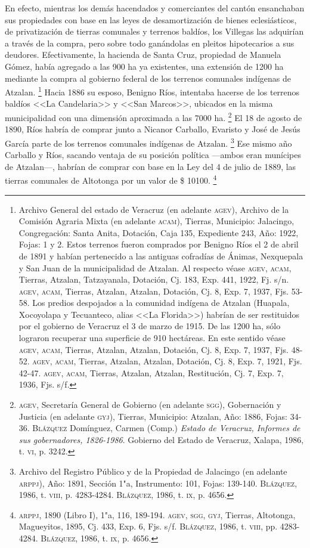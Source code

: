 \documentclass[14pt,twoside,final]{extbook} %
\let\oldfootnote\footnote
\renewcommand\footnote[1]{%
\oldfootnote{\hspace{1mm}#1}}
\begin{document}
En efecto, mientras los demás hacendados y comerciantes del cantón ensanchaban sus propiedades con base en las leyes de desamortización de bienes eclesiásticos, de privatización de tierras comunales y terrenos baldíos, los Villegas las adquirían a través de la compra, pero sobre todo ganándolas en pleitos hipotecarios a sus deudores. Efectivamente, la hacienda de Santa Cruz, propiedad de Manuela Gómez, había agregado a las 900 ha ya existentes, una extensión de 1200 ha mediante la compra al gobierno federal de los terrenos comunales indígenas de Atzalan.\footnote{Archivo General del estado de Veracruz (en adelante \textsc{agev}), Archivo de la Comisión Agraria Mixta
(en adelante \textsc{acam}), Tierras, Municipio: Jalacingo, Congregación: Santa Anita, Dotación, Caja 135, Expediente 243, Año: 1922, Fojas: 1 y 2. Estos terrenos fueron comprados por Benigno Ríos el 2 de abril de 1891 y habían pertenecido a las antiguas cofradías de Ánimas, Nexquepala y San Juan de la municipalidad de Atzalan. Al respecto véase \textsc{agev}, \textsc{acam}, Tierras, Atzalan, Tatzayanala, Dotación, Cj. 183, Exp. 441, 1922, Fj. s/n. \textsc{agev}, \textsc{acam}, Tierras, Atzalan, Atzalan, Dotación, Cj. 8, Exp. 7, 1937, Fjs. 53-58. Los predios despojados a la comunidad indígena de Atzalan (Huapala, Xocoyolapa y Tecuanteco, alias <<La Florida>>) habrían de ser restituidos por el gobierno de Veracruz el 3 de marzo de 1915. De las 1200 ha, sólo lograron recuperar una superficie de 910 hectáreas. En este sentido véase \textsc{agev}, \textsc{acam}, Tierras, Atzalan, Atzalan, Dotación, Cj. 8, Exp. 7, 1937, Fjs. 48-52. \textsc{agev}, \textsc{acam}, Tierras, Atzalan, Atzalan, Dotación, Cj. 8, Exp. 7, 1921, Fjs. 42-47. \textsc{agev}, \textsc{acam}, Tierras, Atzalan, Atzalan, Restitución, Cj. 7, Exp. 7, 1936, Fjs. s/f.} Hacia 1886 su esposo, Benigno Ríos, intentaba hacerse de los terrenos baldíos <<La Candelaria>> y <<San Marcos>>, ubicados en la misma municipalidad con una dimensión aproximada a las 7000 ha.\footnote{\textsc{agev}, Secretaría General de Gobierno (en adelante \textsc{sgg}), Gobernación y Justicia (en adelante \textsc{gyj}), Tierras, Municipio: Atzalan, Año: 1886, Fojas: 34-36. \textsc{Blázquez} Domínguez, Carmen (Comp.)
\emph{Estado de Veracruz, Informes de sus gobernadores, 1826-1986}. Gobierno del Estado de Veracruz, Xalapa, 1986, t. \textsc{vi}, p. 3242.} El 18 de agosto de 1890, Ríos habría de comprar junto a Nicanor Carballo, Evaristo y José de Jesús García parte de los terrenos comunales indígenas de Atzalan.\footnote{Archivo del Registro Público y de la Propiedad de Jalacingo (en adelante \textsc{arppj}), Año: 1891, Sección 1"a, Instrumento: 101, Fojas: 139-140. \textsc{Blázquez}, 1986, t. \textsc{viii}, p. 4283-4284. \textsc{Blázquez}, 1986, t. \textsc{ix}, p. 4656.} Ese mismo año Carballo y Ríos, sacando ventaja de su posición política ---ambos eran munícipes de Atzalan---, habrían de comprar con base en la Ley del 4 de julio de 1889, las tierras comunales de Altotonga por un valor de \$ 10100.\footnote{\textsc{arppj}, 1890 (Libro I), 1"a, 116, 189-194. \textsc{agev, sgg, gyj}, Tierras, Altotonga, Magueyitos, 1895, Cj. 433, Exp. 6, Fjs. s/f. \textsc{Blázquez}, 1986, t. \textsc{viii}, pp. 4283-4284. \textsc{Blázquez}, 1986, t. \textsc{ix}, p. 4656.}
\end{document}
